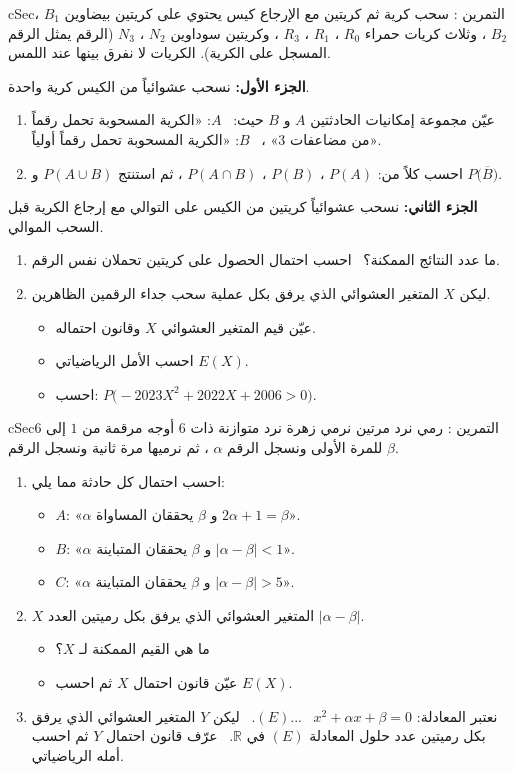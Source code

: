 \documentclass[12pt,a4paper]{article}
\newenvironment{BOX}[2]{\begin{otherlanguage}{english}\begin{arbox}{#1}{#2}}{\end{arbox}\end{otherlanguage}}
\newcounter{exo}
\newenvironment{tamrin}[1]{\stepcounter{exo}\begin{BOX}{cSec}{التمرين \theexo: #1}}{\end{BOX}}
\newcommand{\R}{\mathbb{R}}
\newenvironment{sq}{\begin{itemize}[leftmargin=2.4em,itemsep=3pt]}{\end{itemize}}
\newcommand{\qa}{\item[(أ)]}\newcommand{\qb}{\item[(ب)]}\newcommand{\qc}{\item[(جـ)]}\newcommand{\qd}{\item[(د)]}\newcommand{\qe}{\item[(هـ)]}
\begin{document}
\begin{tamrin}{سحب كرية ثم كريتين مع الإرجاع}
كيس يحتوي على كريتين بيضاوين $B_1$ ، $B_2$ ، وثلاث كريات حمراء $R_0$ ، $R_1$ ، $R_3$ ، وكريتين سوداوين $N_2$ ، $N_3$ (الرقم يمثل الرقم المسجل على الكرية). الكريات لا نفرق بينها عند اللمس.\par
\textbf{الجزء الأول:} نسحب عشوائياً من الكيس كرية واحدة.
\begin{enumerate}
\item عيّن مجموعة إمكانيات الحادثتين $A$ و $B$ حيث: \ $A$: «الكرية المسحوبة تحمل رقماً من مضاعفات $3$» ، \ $B$: «الكرية المسحوبة تحمل رقماً أولياً».
\item احسب كلاً من: $P(A)$ ، $P(B)$ ، $P(A\cap B)$ ، ثم استنتج $P(A\cup B)$ و $P\big(\overline B\big)$.
\end{enumerate}
\textbf{الجزء الثاني:} نسحب عشوائياً كريتين من الكيس على التوالي مع إرجاع الكرية قبل السحب الموالي.
\begin{enumerate}[resume]
\item ما عدد النتائج الممكنة؟ \ احسب احتمال الحصول على كريتين تحملان نفس الرقم.
\item ليكن $X$ المتغير العشوائي الذي يرفق بكل عملية سحب جداء الرقمين الظاهرين.
\begin{sq}
\qa عيّن قيم المتغير العشوائي $X$ وقانون احتماله.
\qb احسب الأمل الرياضياتي $E(X)$.
\qc احسب: $P\big(-2023X^2+2022X+2006>0\big)$.
\end{sq}
\end{enumerate}
\end{tamrin}

\begin{tamrin}{رمي نرد مرتين}
نرمي زهرة نرد متوازنة ذات $6$ أوجه مرقمة من $1$ إلى $6$ للمرة الأولى ونسجل الرقم $\alpha$ ، ثم نرميها مرة ثانية ونسجل الرقم $\beta$.
\begin{enumerate}
\item احسب احتمال كل حادثة مما يلي:
\begin{sq}
\qa $A$: «$\alpha$ و $\beta$ يحققان المساواة $2\alpha+1=\beta$».
\qb $B$: «$\alpha$ و $\beta$ يحققان المتباينة $|\alpha-\beta|<1$».
\qc $C$: «$\alpha$ و $\beta$ يحققان المتباينة $|\alpha-\beta|>5$».
\end{sq}
\item $X$ المتغير العشوائي الذي يرفق بكل رميتين العدد $|\alpha-\beta|$.
\begin{sq}
\qa ما هي القيم الممكنة لـ $X$؟
\qb عيّن قانون احتمال $X$ ثم احسب $E(X)$.
\end{sq}
\item نعتبر المعادلة: $x^2+\alpha x+\beta=0$ \ ...$(E)$. \ ليكن $Y$ المتغير العشوائي الذي يرفق بكل رميتين عدد حلول المعادلة $(E)$ في $\R$. \ عرّف قانون احتمال $Y$ ثم احسب أمله الرياضياتي.
\end{enumerate}
\end{tamrin}
\end{document}
